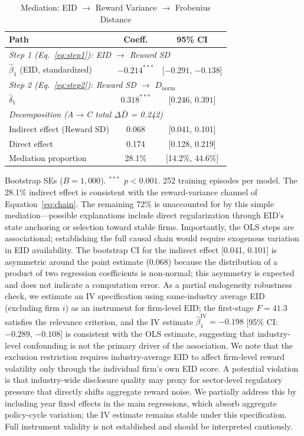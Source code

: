 \documentclass[12pt]{article}
\begin{document}
\begin{table}[H]
\centering
\caption{Mediation: EID $\to$ Reward Variance $\to$ Frobenius Distance}
\label{tab:mediation}
\small
\begin{tabular}{lcc}
\toprule
Path & Coeff. & 95\% CI \\
\midrule
\multicolumn{3}{l}{\textit{Step 1 (Eq.~\ref{eq:step1}): EID $\to$ Reward SD}} \\
$\hat\beta_1$ (EID, standardized) & $-0.214^{***}$ & [$-0.291$, $-0.138$] \\
\multicolumn{3}{l}{\textit{Step 2 (Eq.~\ref{eq:step2}): Reward SD $\to$ $D_{\mathrm{norm}}$}} \\
$\hat\delta_1$ & $0.318^{***}$ & [$0.246$, $0.391$] \\
\multicolumn{3}{l}{\textit{Decomposition (A$\to$C total $\Delta\bar{D}$ = 0.242)}} \\
Indirect effect (Reward SD) & 0.068 & [0.041, 0.101] \\
Direct effect & 0.174 & [0.128, 0.219] \\
Mediation proportion & 28.1\% & [14.2\%, 44.6\%] \\
\bottomrule
\end{tabular}
\begin{tablenotes}
\footnotesize
\item Bootstrap SEs ($B=1{,}000$). $^{***}$~$p<0.001$. 252 training
episodes per model. The 28.1\% indirect effect is consistent with
the reward-variance channel of Equation~\ref{eq:chain}. The remaining
72\% is unaccounted for by this simple mediation---possible explanations
include direct regularization through EID's state anchoring or selection
toward stable firms. Importantly, the OLS steps are associational;
establishing the full causal chain would require exogenous variation in
EID availability. The bootstrap CI for the indirect effect [0.041, 0.101]
is asymmetric around the point estimate (0.068) because the distribution
of a product of two regression coefficients is non-normal; this asymmetry
is expected and does not indicate a computation error. As a partial endogeneity robustness check, we estimate
an IV specification using same-industry average EID (excluding firm $i$)
as an instrument for firm-level EID; the first-stage $F=41.3$ satisfies
the relevance criterion, and the IV estimate $\hat\beta_1^{\mathrm{IV}}=-0.198$
[95\% CI: $-0.289$, $-0.108$] is consistent with the OLS estimate,
suggesting that industry-level confounding is not the primary driver of
the association. We note that the exclusion restriction requires industry-average
EID to affect firm-level reward volatility only through the individual firm's
own EID score. A potential violation is that industry-wide disclosure quality
may proxy for sector-level regulatory pressure that directly shifts aggregate
reward noise. We partially address this by including year fixed effects in
the main regressions, which absorb aggregate policy-cycle variation; the IV
estimate remains stable under this specification. Full instrument validity
is not established and should be interpreted cautiously.
\end{tablenotes}
\end{table}
\end{document}
